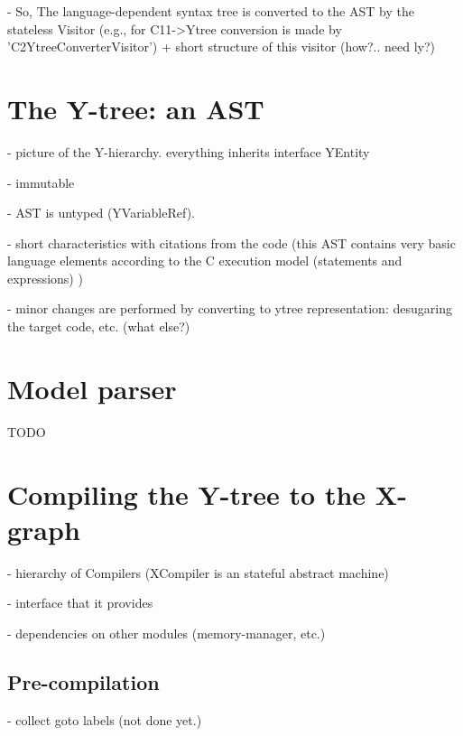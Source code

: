 - So, The language-dependent syntax tree is converted to the AST by the stateless Visitor (e.g., for C11->Ytree conversion is made by 'C2YtreeConverterVisitor') + short structure of this visitor (how?.. need ly?)


\section{The Y-tree: an AST}
\label{ch:impl:ytree}

- picture of the Y-hierarchy. everything inherits interface YEntity

- immutable

- AST is untyped (YVariableRef).

- short characteristics with citations from the code (this AST contains very basic language elements according to the C execution model (statements and expressions) )

- minor changes are performed by converting to ytree representation: desugaring the target code, etc. (what else?)


\section{Model parser}
\label{ch:impl:model}

TODO


\section{Compiling the Y-tree to the X-graph}
\label{ch:impl:y2x}




- hierarchy of Compilers (XCompiler is an stateful abstract machine)

- interface that it provides

- dependencies on other modules (memory-manager, etc.)


\subsection{Pre-compilation}
\label{ch:impl:y2x:precomp}

- collect goto labels (not done yet.)

